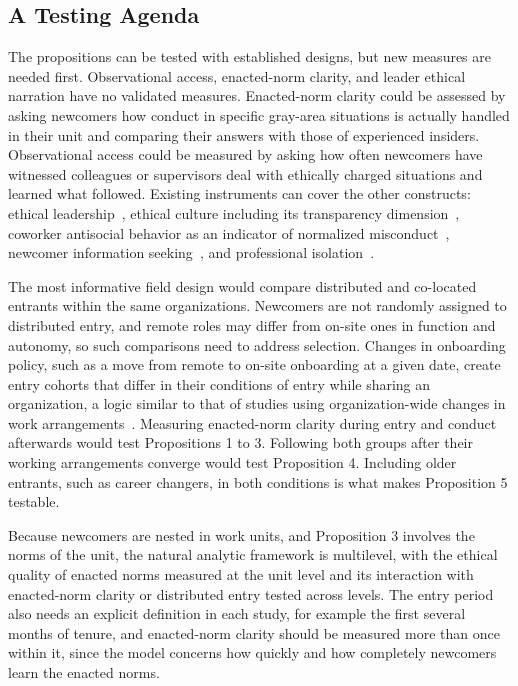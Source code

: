 \documentclass[12pt,a4paper]{article}
\theoremstyle{definition}
\begin{document}
\subsection{A Testing Agenda}

The propositions can be tested with established designs, but new measures are needed first. Observational access, enacted-norm clarity, and leader ethical narration have no validated measures. Enacted-norm clarity could be assessed by asking newcomers how conduct in specific gray-area situations is actually handled in their unit and comparing their answers with those of experienced insiders. Observational access could be measured by asking how often newcomers have witnessed colleagues or supervisors deal with ethically charged situations and learned what followed. Existing instruments can cover the other constructs: ethical leadership~\citep{brown2005ethical}, ethical culture including its transparency dimension~\citep{kaptein2008developing}, coworker antisocial behavior as an indicator of normalized misconduct~\citep{robinson1998monkey}, newcomer information seeking~\citep{morrison1993newcomer}, and professional isolation~\citep{golden2008impact}.

The most informative field design would compare distributed and co-located entrants within the same organizations. Newcomers are not randomly assigned to distributed entry, and remote roles may differ from on-site ones in function and autonomy, so such comparisons need to address selection. Changes in onboarding policy, such as a move from remote to on-site onboarding at a given date, create entry cohorts that differ in their conditions of entry while sharing an organization, a logic similar to that of studies using organization-wide changes in work arrangements~\citep{yang2022effects}. Measuring enacted-norm clarity during entry and conduct afterwards would test Propositions 1 to 3. Following both groups after their working arrangements converge would test Proposition 4. Including older entrants, such as career changers, in both conditions is what makes Proposition 5 testable.

Because newcomers are nested in work units, and Proposition 3 involves the norms of the unit, the natural analytic framework is multilevel, with the ethical quality of enacted norms measured at the unit level and its interaction with enacted-norm clarity or distributed entry tested across levels. The entry period also needs an explicit definition in each study, for example the first several months of tenure, and enacted-norm clarity should be measured more than once within it, since the model concerns how quickly and how completely newcomers learn the enacted norms.
\end{document}
